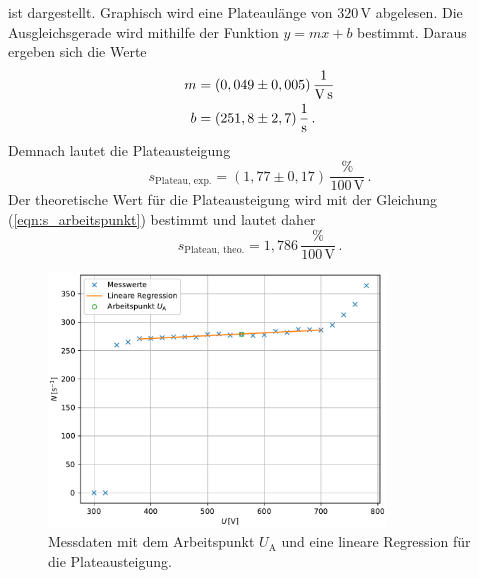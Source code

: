 ist dargestellt. Graphisch wird eine Plateaulänge von $320\,\unit{\volt}$ abgelesen. Die Ausgleichsgerade wird mithilfe der Funktion $y = mx+b$ bestimmt. Daraus ergeben sich die Werte
\begin{align*}
  m &= (0,049\pm0,005)\,\unit[per-mode=fraction]{\per\volt\per\second}\\
  b &= (251,8\pm2,7)\,\unit[per-mode=fraction]{\per\second}\,.
\end{align*}
Demnach lautet die Plateausteigung 
$$s_{\text{Plateau, exp.}} = (1,77\pm0,17)\,\frac{\%}{100\,\unit{\volt}}\,.$$
Der theoretische Wert für die Plateausteigung wird mit der Gleichung (\ref{eqn:s_arbeitspunkt}) bestimmt und lautet daher 
$$s_{\text{Plateau, theo.}} =  1,786 \,\frac{\%}{100\,\unit{\volt}}\,.$$

\begin{figure}[H]
  \centering
  \includegraphics[width=0.8\textwidth]{Kennlinie.pdf}
  \caption{Messdaten mit dem Arbeitspunkt $U_{\text{A}}$ und eine lineare Regression für die Plateausteigung.}
  \label{fig:Kennlinie_Plot}
\end{figure}

